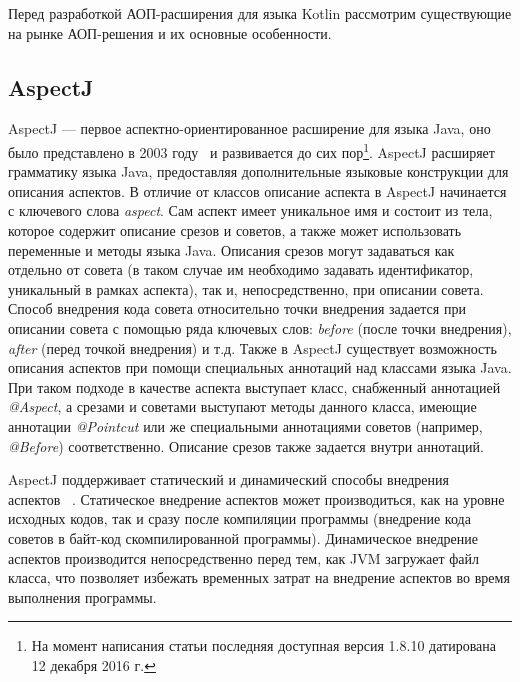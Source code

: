 \documentclass[conference]{IEEEtran}
\begin{document}
Перед разработкой АОП-расширения для языка Kotlin рассмотрим существующие на
рынке АОП-решения и их основные особенности.

\subsection{AspectJ}
AspectJ --- первое аспектно-ориентированное расширение для языка Java, оно 
было представлено в 2003 году~\cite{kiczales_aspectj} и развивается до сих 
пор\footnote{На момент написания статьи последняя доступная версия 1.8.10 
датирована 12 декабря 2016 г.}.
AspectJ расширяет грамматику языка Java, предоставляя дополнительные языковые
конструкции для описания аспектов.
В отличие от классов описание аспекта в AspectJ начинается с ключевого слова
\textit{aspect}. Сам аспект имеет уникальное имя и состоит из тела, которое 
содержит описание срезов и советов, а также может использовать переменные и 
методы языка Java.
Описания срезов могут задаваться как отдельно от совета (в таком случае им
необходимо задавать идентификатор, уникальный в рамках аспекта), так и,
непосредственно, при описании совета.
Способ внедрения кода совета относительно точки внедрения задается при
описании совета с помощью ряда ключевых слов: \textit{before} (после точки
внедрения), \textit{after} (перед точкой внедрения) и т.д.
Также в AspectJ существует возможность описания аспектов при помощи специальных
аннотаций над классами языка Java.
При таком подходе в качестве аспекта выступает класс, снабженный аннотацией
\textit{@Aspect}, а срезами и советами выступают методы данного класса,
имеющие аннотации \textit{@Pointcut} или же специальными аннотациями советов
(например, \textit{@Before}) соответственно.
Описание срезов также задается внутри аннотаций.

AspectJ поддерживает статический и динамический способы внедрения аспектов~
\cite{aspectj_doc}.
Статическое внедрение аспектов может производиться, как на уровне исходных
кодов, так и сразу после компиляции программы (внедрение кода советов в байт-код
скомпилированной программы).
Динамическое внедрение аспектов производится непосредственно перед тем, как JVM
загружает файл класса, что позволяет избежать временных затрат на внедрение
аспектов во время выполнения программы.

\end{document}
